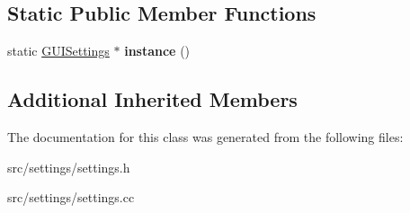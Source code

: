 \subsection*{Static Public Member Functions}
\begin{DoxyCompactItemize}
\item 
static \hyperlink{classsettings_1_1GUISettings}{G\+U\+I\+Settings} $\ast$ {\bfseries instance} ()\hypertarget{classsettings_1_1GUISettings_a162cde7ce90582456e4a6ebd998c398d}{}\label{classsettings_1_1GUISettings_a162cde7ce90582456e4a6ebd998c398d}

\end{DoxyCompactItemize}
\subsection*{Additional Inherited Members}


The documentation for this class was generated from the following files\+:\begin{DoxyCompactItemize}
\item 
src/settings/settings.\+h\item 
src/settings/settings.\+cc\end{DoxyCompactItemize}

